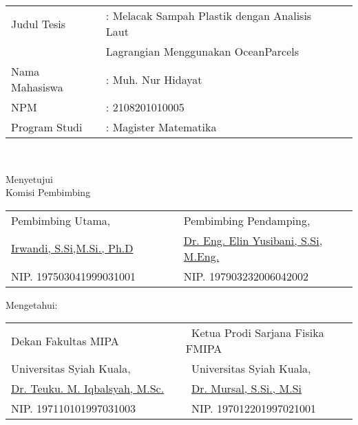 \setcounter{page}{2}
\vspace{1.5pc}

\begin{center}
	\normalsize
	\noindent
	\begin{tabular}{l l l}
		Judul Tesis \verb"  " &: Melacak Sampah Plastik dengan Analisis Laut  \\ & Lagrangian Menggunakan OceanParcels  \\
		Nama Mahasiswa &: Muh. Nur Hidayat \\
		NPM &: 2108201010005 \\
		Program Studi	&: Magister Matematika \\ 
	\end{tabular} \\
\end{center}

\begin{center}
	\vspace{4cm}
	Menyetujui\\
	Komisi Pembimbing
	
	\vspace{1cm}
	
	\begin{tabular}{l l }
		Pembimbing Utama,\verb"                 " & Pembimbing Pendamping, \verb"            "\\[2.25cm]
		\underline{Irwandi, S.Si,M.Si., Ph.D} & \underline{Dr. Eng. Elin Yusibani, S.Si, M.Eng.}\\
		NIP. 197503041999031001 & NIP. 197903232006042002
	\end{tabular}
\end{center}

\begin{center}
	\vspace{0.5cm}
	Mengetahui:\\%
	
	\vspace{1cm}
	
	\begin{tabular}{l l }
		Dekan Fakultas MIPA\verb"             " & \verb" "Ketua Prodi Sarjana Fisika FMIPA\\
		Universitas Syiah Kuala, & \verb" "Universitas Syiah Kuala,\\[2.25cm]
		\underline{Dr. Teuku. M. Iqbalsyah, M.Sc.} & \verb" "\underline{Dr. Mursal, S.Si., M.Si}\\
		NIP. 197110101997031003 & \verb" "NIP. 197012201997021001
	\end{tabular}
\end{center}
\vspace{0.3cm}
\begin{center}
	
\end{center}
\thispagestyle{empty}
